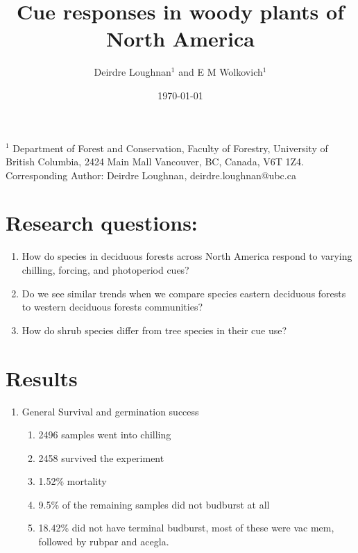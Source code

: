 \documentclass{article}
\begin{document}
\renewcommand{\bibname}{References}%



\title{Cue responses in woody plants of North America}
\date{\today}
\author{Deirdre Loughnan$^1$ and E M Wolkovich$^1$}
\maketitle 

$^1$ Department of Forest and Conservation, Faculty of Forestry, University of British Columbia, 2424 Main Mall
Vancouver, BC, Canada, V6T 1Z4. \\

Corresponding Author: Deirdre Loughnan, deirdre.loughnan@ubc.ca \\


\section{Research questions:}

\begin{enumerate}
\item How do species in deciduous forests across North America respond to varying chilling, forcing, and photoperiod cues?
\item Do we see similar trends when we compare species eastern deciduous forests to western deciduous forests communities? 
\item How do shrub species differ from tree species in their cue use?
\end{enumerate}

\section{Results}

\begin{enumerate}
\item General Survival and germination success

\begin{enumerate}
\item 2496 samples went into chilling
\item 2458 survived the experiment
\item 1.52\% mortality
\item 9.5\% of the remaining samples did not budburst at all
\item 18.42\% did not have terminal budburst, most of these were vac mem, followed by rubpar and acegla. 
\end{enumerate}

\end{enumerate}
\end{document}
